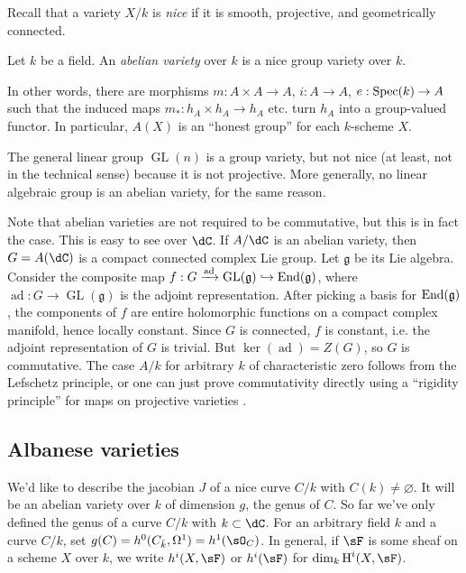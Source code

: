 Recall that a variety $X/k$ is \emph{nice} if it is smooth, projective, and 
geometrically connected. 

\begin{definition}
Let $k$ be a field. An \emph{abelian variety} over $k$ is a nice group variety 
over $k$.
\end{definition}

In other words, there are morphisms $m:A\times A\to A$, $i:A\to A$, 
$e:\operatorname{Spec}(k)\to A$ such that the induced maps $m_*:h_A\times h_A\to h_A$ etc. 
turn $h_A$ into a group-valued functor. In particular, $A(X)$ is an ``honest  
group'' for each $k$-scheme $X$. 

\begin{example}
The general linear group $\operatorname{GL}(n)$ is a group variety, but not 
nice (at least, not in the technical sense) because it is not projective. More 
generally, no linear algebraic group is an abelian variety, for the same 
reason. 
\end{example}

Note that abelian varieties are not required to be commutative, but this is in 
fact the case. This is easy to see over $\dC$. If $A/\dC$ is an 
abelian variety, then $G=A(\dC)$ is a compact connected complex Lie 
group. Let $\mathfrak{g}$ be its Lie algebra. Consider the composite map 
$f:G\xrightarrow{\text{ad}}\operatorname{GL}(\mathfrak{g}) \hookrightarrow 
\operatorname{End}(\mathfrak{g})$, where 
$\operatorname{ad}:G\to\operatorname{GL}(\mathfrak{g})$ is the adjoint 
representation. After picking a basis for $\operatorname{End}(\mathfrak{g})$, 
the components of $f$ are entire holomorphic functions on a compact complex 
manifold, hence locally constant. Since $G$ is connected, $f$ is constant, i.e. 
the adjoint representation of $G$ is trivial. But 
$\ker(\operatorname{ad}) = Z(G)$, so $G$ is commutative.
The case $A/k$ for arbitrary $k$ of characteristic zero 
follows from the Lefschetz principle, or one can just prove commutativity 
directly using a ``rigidity principle'' for maps on projective varieties
\cite[I.1.4]{mi-av}. 





\subsection{Albanese varieties}

We'd like to describe the jacobian $J$ of a nice curve $C/k$ with 
$C(k)\ne\varnothing$. It will be an abelian variety over $k$ of dimension 
$g$, the genus of $C$. So far we've only defined the genus of a curve $C/k$ with 
$k\subset \dC$. For an arbitrary field $k$ and a curve $C/k$, set 
$g(C)=h^0(C_{\bar k},\Omega^1) = h^1(\sO_C)$. In general, if $\sF$ is some 
sheaf on a scheme $X$ over $k$, we write $h^i(X,\sF)$ or $h^i(\sF)$ for 
$\dim_k \h^i(X,\sF)$.

